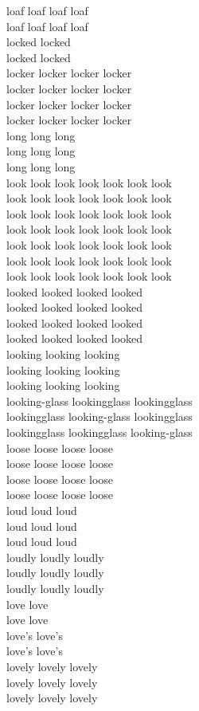 loaf loaf loaf loaf\\
loaf loaf loaf loaf\\
locked locked\\
locked locked\\
locker locker locker locker\\
locker locker locker locker\\
locker locker locker locker\\
locker locker locker locker\\
long long long\\
long long long\\
long long long\\
look look look look look look look\\
look look look look look look look\\
look look look look look look look\\
look look look look look look look\\
look look look look look look look\\
look look look look look look look\\
look look look look look look look\\
looked looked looked looked\\
looked looked looked looked\\
looked looked looked looked\\
looked looked looked looked\\
looking looking looking\\
looking looking looking\\
looking looking looking\\
looking-glass lookingglass lookingglass\\
lookingglass looking-glass lookingglass\\
lookingglass lookingglass looking-glass\\
loose loose loose loose\\
loose loose loose loose\\
loose loose loose loose\\
loose loose loose loose\\
loud loud loud\\
loud loud loud\\
loud loud loud\\
loudly loudly loudly\\
loudly loudly loudly\\
loudly loudly loudly\\
love love\\
love love\\
love's love's\\
love's love's\\
lovely lovely lovely\\
lovely lovely lovely\\
lovely lovely lovely\\



